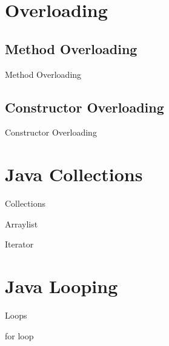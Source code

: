 \documentclass[11pt]{beamer}
\begin{document}
\section{Overloading}
\subsection{Method Overloading}
\begin{frame}{Method Overloading}

\end{frame}


\subsection{Constructor Overloading}
\begin{frame}{Constructor Overloading}

\end{frame}


\section{Java Collections}
\begin{frame}{Collections}

\end{frame}



\begin{frame}{Arraylist}

\end{frame}



\begin{frame}{Iterator}

\end{frame}

\section{Java Looping}
\begin{frame}{Loops}

\end{frame}



\begin{frame}{for loop}

\end{frame}
\end{document}
